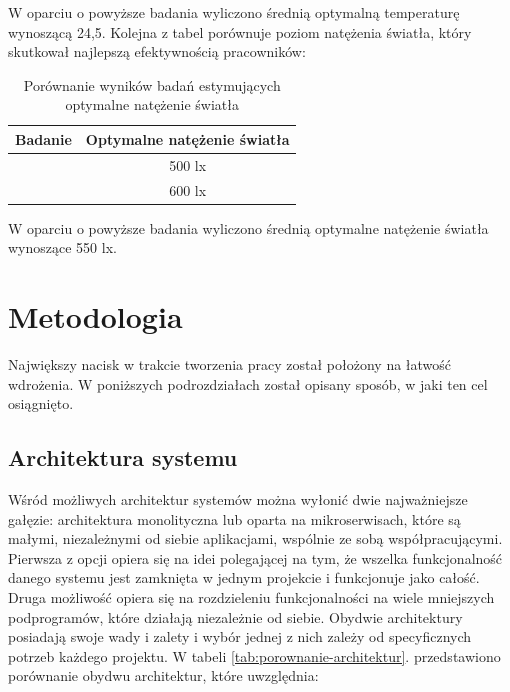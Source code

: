 \documentclass[11pt, a4]{article} %
\begin{document}
W oparciu o powyższe badania wyliczono średnią optymalną temperaturę wynoszącą 24,5.
Kolejna z tabel porównuje poziom natężenia światła, który skutkował najlepszą 
efektywnością pracowników:

\begin{table}[h!]
    \centering
    \caption{Porównanie wyników badań estymujących optymalne natężenie światła}
    \begin{tabular}{ |c|c| } 
     \hline
     Badanie & Optymalne natężenie światła \\ 
     \hline
     \parencite{chinchiuan:2014ac} & 500 lx \\ 
     \hline
     \parencite{liu:2017aj} & 600 lx \\ 
     \hline
    \end{tabular}
    \label{tab:optymalne-natezenie}
\end{table}

W oparciu o powyższe badania wyliczono średnią optymalne natężenie światła 
wynoszące 550 lx.

\section{Metodologia}

Największy nacisk w trakcie tworzenia pracy został położony na łatwość wdrożenia. 
W poniższych podrozdziałach został opisany sposób, w jaki ten cel osiągnięto.

\subsection{Architektura systemu}

Wśród możliwych architektur systemów można wyłonić dwie najważniejsze gałęzie: 
architektura monolityczna lub oparta na mikroserwisach, które są małymi, niezależnymi 
od siebie aplikacjami, wspólnie ze sobą współpracującymi. Pierwsza z opcji opiera się 
na idei polegającej na tym, że wszelka funkcjonalność danego systemu jest zamknięta 
w jednym projekcie i funkcjonuje jako całość. Druga możliwość opiera się na 
rozdzieleniu funkcjonalności na wiele mniejszych podprogramów, które działają 
niezależnie od siebie. Obydwie architektury posiadają swoje wady i zalety i wybór 
jednej z nich zależy od specyficznych potrzeb każdego projektu. W tabeli 
\ref{tab:porownanie-architektur}. przedstawiono porównanie obydwu architektur, które 
uwzględnia:
\end{document}
